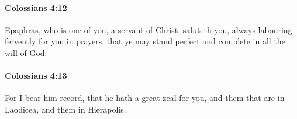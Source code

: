 		\paragraph{Colossians 4:12} %
			\label{COLOSSIANS-4-12}

			Epaphras, who is one of you, a servant of Christ, saluteth you, always labouring fervently for you in prayers, that ye may stand perfect and complete in all the will of God.

			\begin{framed}
			\scriptsize
				\begin{compactdesc}
					\item[SBLG] 
				\end{compactdesc}
			\end{framed}

		\paragraph{Colossians 4:13} %
			\label{COLOSSIANS-4-13}

			For I bear him record, that he hath a great zeal for you, and them that are in Laodicea, and them in Hierapolis.

